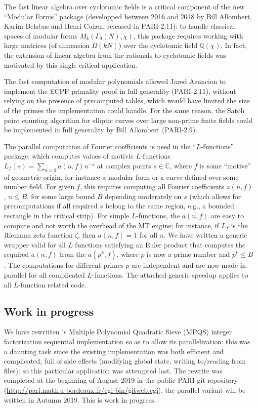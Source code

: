 \documentclass{deliverablereport}
\begin{document}
The fast linear algebra over cyclotomic fields is a critical component of the
new ``Modular Forms'' package (developped between 2016 and 2018 by Bill
Allombert, Karim Belabas and Henri Cohen, released in PARI-2.11): to handle
classical spaces of modular forms $M_k(\Gamma_0(N), \chi)$, this package
requires working with large matrices (of dimension $\Omega(kN)$) over the
cyclotomic field $\mathbb{Q}(\chi)$. In fact, the extension of linear algebra
from the rationals to cyclotomic fields was motivated by this single critical
application.

The fast computation of modular polynomials allowed Jared Asuncion to
implement the ECPP primality proof in full generality (PARI-2.11), without
relying on the presence of precomputed tables, which would have limited the
size of the primes the implementation could handle. For the same reason, the
Satoh point counting algorithm for elliptic curves over large non-prime
finite fields could be implemented in full generality by Bill Allombert
(PARI-2.9).

The parallel computation of Fourier coefficients is used
in the ``$L$-functions'' package, which computes values of motivic
$L$-functions $L_f(s) = \sum_{n>0} a(n,f) n^{-s}$ at complex points $s\in
\mathbb{C}$, where $f$ is some ``motive'' of geometric origin, for instance a
modular form or a curve defined over some number field. For given $f$, this
requires computing all Fourier coefficients $a(n,f)$, $n \leq B$, for
some large bound $B$ depending moderately on $s$ (which allows for
precomputations if all required $s$ belong to the same region, e.g., a
bounded rectangle in the critical strip). For simple $L$-functions, the
$a(n,f)$ are easy to compute and not worth the overhead of the MT engine; for
instance, if $L_f$ is the Riemann zeta function $\zeta$, then $a(n,f) = 1$
for all $n$. We have written a generic wrapper valid for all $L$ functions
satisfying an Euler product that computes the required $a(n,f)$ from the
$a(p^k,f)$, where $p$ is now a prime number and $p^k\leq B$. The computations
for different primes $p$ are independent and are now made in parallel for all
complicated $L$-functions. The attached generic speedup applies to all
$L$-function related code.

\subsection{Work in progress}

We have rewritten \Pari's Multiple Polynomial Quadratic Sieve (MPQS) integer
factorization sequential implementation so as to allow its parallelization:
this was a daunting task since the existing implementation was both efficient
and complicated, full of side effects (modifying global state, writing
to/reading from files); so this particular application was attempted last.
The rewrite was completed at the beginning of August 2019 in the public
PARI git repository (\url{http://pari.math.u-bordeaux.fr/cgi-bin/gitweb.cgi}),
the parallel variant will be written in Autumn 2019. This is work in
progress.
\end{document}
